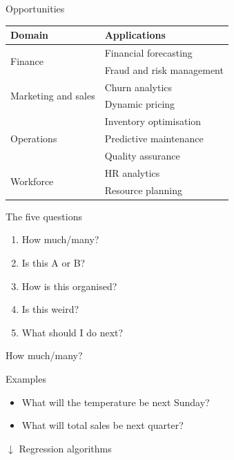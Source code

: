 \begin{frame}{Opportunities}
    \begin{center}
        \begin{tabular}{ll}
            \toprule
            \textbf{Domain}                      & \textbf{Applications} \\
            \midrule
            \multirow{2}{*}{Finance}             & Financial forecasting \\
                                                 & Fraud and risk management \\
            \midrule
            \multirow{2}{*}{Marketing and sales} & Churn analytics \\
                                                 & Dynamic pricing \\
            \midrule
            \multirow{3}{*}{Operations}          & Inventory optimisation \\
                                                 & Predictive maintenance \\
                                                 & Quality assurance \\
            \midrule
            \multirow{2}{*}{Workforce}           & HR analytics \\
                                                 & Resource planning \\
            \bottomrule
        \end{tabular}
    \end{center}
\end{frame}

\begin{frame}{The five questions}
    \begin{enumerate}
        \item How much/many?
        \item Is this A or B?
        \item How is this organised?
        \item Is this weird?
        \item What should I do next?
    \end{enumerate}
\end{frame}

\begin{frame}{How much/many?}
    \begin{block}{Examples}
        \begin{itemize}
            \item What will the temperature be next Sunday?
            \item What will total sales be next quarter?
        \end{itemize}
    \end{block}
    \begin{center}
        \large%
        $\downarrow$
        \vfill
        \alert{Regression} algorithms
    \end{center}
\end{frame}

